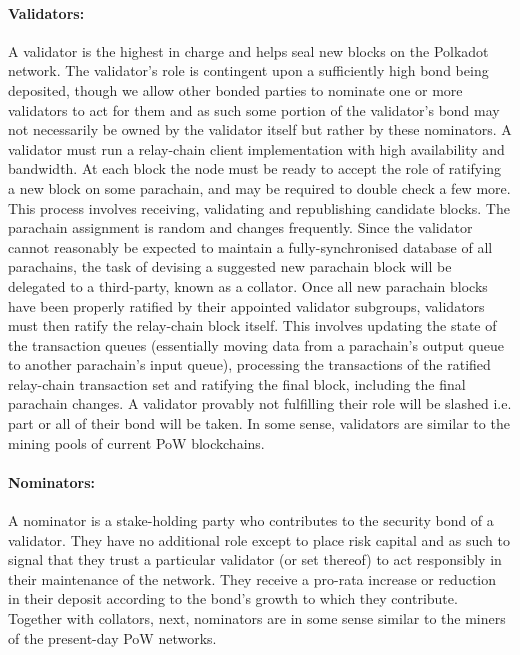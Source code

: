 \documentclass{article}
\begin{document}
\paragraph{Validators:}\label{par:validators} A validator is the highest in charge and helps seal new blocks on the Polkadot network. The validator’s role is contingent upon a sufficiently high bond being deposited, though we allow other bonded parties to nominate one or more validators to act for them and as such some portion of the validator’s bond may not necessarily be owned by the validator itself but rather by these nominators.
A validator must run a relay-chain client implementation with high availability and bandwidth. At each block the node must be ready to accept the role of ratifying a new block on some parachain, and may be required to double check a few more. This process involves receiving, validating and republishing candidate blocks. The parachain assignment is random and changes frequently. Since the validator cannot reasonably be expected to maintain a fully-synchronised database of all parachains, the task of devising a suggested new parachain block will be delegated to a third-party, known as a collator.
Once all new parachain blocks have been properly ratified by their appointed validator subgroups, validators must then ratify the relay-chain block itself. This involves updating the state of the transaction queues (essentially moving data from a parachain’s output queue to another parachain’s input queue), processing the transactions of the ratified relay-chain transaction set and ratifying the final block, including the final parachain changes.
A validator provably not fulfilling their role will be slashed i.e. part or all of their bond will be taken.
In some sense, validators are similar to the mining pools of current PoW blockchains.

\paragraph{Nominators:}\label{par:nominators} A nominator is a stake-holding party who contributes to the security bond of a validator. They have no additional role except to place risk capital and as such to signal that they trust a particular validator (or set thereof) to act responsibly in their maintenance of the network. They receive a pro-rata increase or reduction in their deposit according to the bond’s growth to which they contribute. Together with collators, next, nominators are in some sense similar to the miners of the present-day PoW networks.
\end{document}

